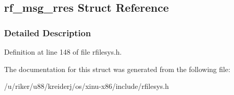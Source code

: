 \hypertarget{structrf__msg__rres}{}\subsection{rf\+\_\+msg\+\_\+rres Struct Reference}
\label{structrf__msg__rres}


\subsubsection{Detailed Description}


Definition at line 148 of file rfilesys.\+h.



The documentation for this struct was generated from the following file\+:\begin{DoxyCompactItemize}
\item 
/u/riker/u88/kreiderj/os/xinu-\/x86/include/rfilesys.\+h\end{DoxyCompactItemize}
